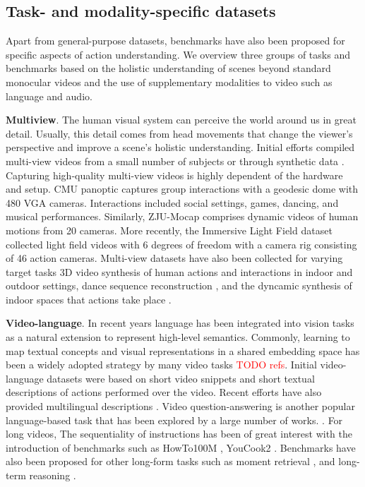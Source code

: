 \documentclass[smallextended,twocolumn,natbib]{svjour3}
\begin{document}
\subsection{Task- and modality-specific datasets}
\label{sec:datasets::specific}

Apart from general-purpose datasets, benchmarks have also been proposed for specific aspects of action understanding. We overview three groups of tasks and benchmarks based on the holistic understanding of scenes beyond standard monocular videos and the use of supplementary modalities to video such as language and audio. 

\noindent
\textbf{Multiview}. The human visual system can perceive the world around us in great detail. Usually, this detail comes from head movements that change the viewer's perspective and improve a scene's holistic understanding. 
Initial efforts compiled multi-view videos from a small number of subjects \citep{sigal2010humaneva} or through synthetic data \citep{ionescu2013human3}. Capturing high-quality multi-view videos is highly dependent of the hardware and setup. CMU panoptic \citep{joo2017panoptic} captures group interactions with a geodesic dome with 480 VGA cameras. Interactions included social settings, games, dancing, and musical performances. Similarly, ZJU-Mocap \citep{peng2021neural} comprises dynamic videos of human motions from 20 cameras. More recently, the Immersive Light Field dataset \citep{broxton2020immersive} collected light field videos with 6 degrees of freedom with a camera rig consisting of 46 action cameras. Multi-view datasets have also been collected for varying target tasks 3D video synthesis of human actions and interactions in indoor \citep{li2022neural} and outdoor \citep{lin2021deep,yoon2020novel} settings, dance sequence reconstruction \citep{tsuchida2019aist}, and the dyncamic synthesis of indoor spaces that actions take place \citep{tschernezki2024epic}.

\noindent
\textbf{Video-language}. In recent years language has been integrated into vision tasks as a natural extension to represent high-level semantics. Commonly, learning to map textual concepts and visual representations in a shared embedding space has been a widely adopted strategy by many video tasks \textcolor{red}{TODO refs}. Initial video-language datasets \citep{chen2011collecting,xu2016msr} were based on short video snippets and short textual descriptions of actions performed over the video. Recent efforts have also provided multilingual descriptions \citep{wang2019vatex}. Video question-answering is another popular language-based task that has been explored by a large number of works. \citep{jang2017tgif,lei2018tvqa,li2024mvbench,oncescu2021queryd,xiao2021next}. For long videos, The sequentiality of instructions has been of great interest with the introduction of benchmarks such as HowTo100M \citep{miech2019howto100m}, YouCook2 \citep{zhou2018towards}. Benchmarks have also been proposed for other long-form tasks such as moment retrieval \citep{song2024moviechat,yang2024vidchapters}, and long-term reasoning \citep{mangalam2023egoschema}.
\end{document}
